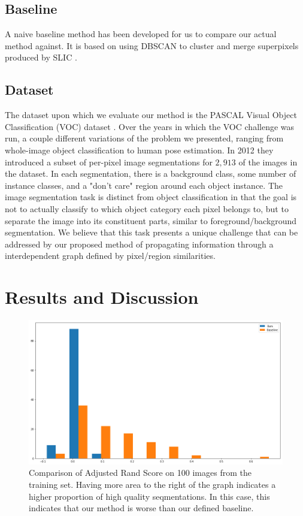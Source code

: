 \documentclass[twocolumn]{article}
\newcommand{\seclab}[1]{\label{sec:#1}}
\newcommand{\figlab}[1]{\label{fig:#1}}
\begin{document}
\subsection{Baseline}

A naive baseline method has been developed for us to compare our actual method
against. It is based on using DBSCAN \cite{ester1996density} to cluster and
merge superpixels produced by SLIC \cite{achanta2010slic}.

\subsection{Dataset}\seclab{data}

The dataset upon which we evaluate our method is the PASCAL Visual Object
Classification (VOC) dataset \cite{Everingham10}. Over the years in which the
VOC challenge was run, a couple different variations of the problem we
presented, ranging from whole-image object classification to human pose
estimation. In 2012 they introduced a subset of per-pixel image segmentations
for $2,913$ of the images in the dataset. In each segmentation, there is a
background class, some number of instance classes, and a "don't care" region
around each object instance. The image segmentation task is distinct from
object classification in that the goal is not to actually classify to which
object category each pixel belongs to, but to separate the image into its
constituent parts, similar to foreground/background segmentation. We believe
that this task presents a unique challenge that can be addressed by our proposed
method of propagating information through a interdependent graph defined by
pixel/region similarities.

\section{Results and Discussion}\seclab{results}

\begin{figure}
  \centering
  \includegraphics[width=\linewidth]{figs/bars.png}
  \caption{Comparison of Adjusted Rand Score on 100 images from the training
  set. Having more area to the right of the graph indicates a higher proportion
  of high quality seqmentations. In this case, this indicates that our method is
  worse than our defined baseline.
  }
  \figlab{bars}
\end{figure}
\end{document}
